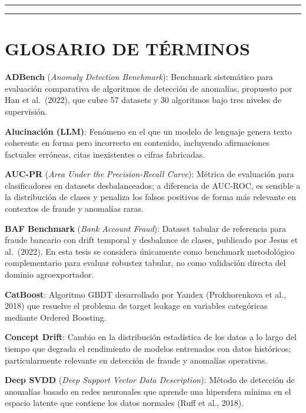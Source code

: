 \begin{center}\rule{0.5\linewidth}{0.5pt}\end{center}

\begin{center}\rule{0.5\linewidth}{0.5pt}\end{center}

\section{GLOSARIO DE TÉRMINOS}\label{glosario-de-tuxe9rminos}

\textbf{ADBench} (\emph{Anomaly Detection Benchmark}): Benchmark
sistemático para evaluación comparativa de algoritmos de detección de
anomalías, propuesto por Han et al.~(2022), que cubre 57 datasets y 30
algoritmos bajo tres niveles de supervisión.

\textbf{Alucinación (LLM)}: Fenómeno en el que un modelo de lenguaje
genera texto coherente en forma pero incorrecto en contenido, incluyendo
afirmaciones factuales erróneas, citas inexistentes o cifras fabricadas.

\textbf{AUC-PR} (\emph{Area Under the Precision-Recall Curve}): Métrica
de evaluación para clasificadores en datasets desbalanceados; a
diferencia de AUC-ROC, es sensible a la distribución de clases y
penaliza los falsos positivos de forma más relevante en contextos de
fraude y anomalías raras.

\textbf{BAF Benchmark} (\emph{Bank Account Fraud}): Dataset tabular de
referencia para fraude bancario con drift temporal y desbalance de
clases, publicado por Jesus et al.~(2022). En esta tesis se considera
únicamente como benchmark metodológico complementario para evaluar
robustez tabular, no como validación directa del dominio agroexportador.

\textbf{CatBoost}: Algoritmo GBDT desarrollado por Yandex (Prokhorenkova
et al., 2018) que resuelve el problema de target leakage en variables
categóricas mediante Ordered Boosting.

\textbf{Concept Drift}: Cambio en la distribución estadística de los
datos a lo largo del tiempo que degrada el rendimiento de modelos
entrenados con datos históricos; particularmente relevante en detección
de fraude y anomalías operativas.

\textbf{Deep SVDD} (\emph{Deep Support Vector Data Description}): Método
de detección de anomalías basado en redes neuronales que aprende una
hipersfera mínima en el espacio latente que contiene los datos normales
(Ruff et al., 2018).

